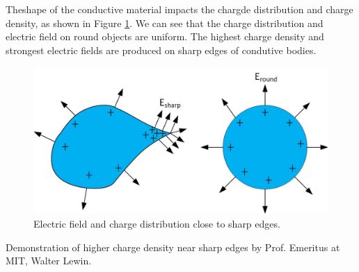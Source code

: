 \documentclass{ximera}
\begin{document}
Theshape of the conductive material impacts the chargde distribution and charge density, as shown in Figure \ref{fig:sharpEdge}. We can see that the charge distribution and electric field on round objects are uniform. The highest charge density and strongest electric fields are produced on sharp edges of condutive bodies.


\begin{figure}[htbp]
\begin{center}
\includegraphics[scale=0.8]{../jpg/sharpEdges.jpg}
\end{center} 
\caption{Electric field and charge distribution close to sharp edges.}\label{fig:sharpEdge}
\end{figure}

Demonstration of higher charge density near sharp edges by Prof. Emeritus at MIT, Walter Lewin.
\begin{center}  
\end{center}
\end{document}
